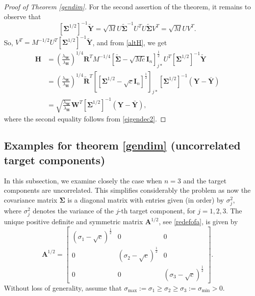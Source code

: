 \documentclass{article}
\theoremstyle{plain}
\theoremstyle{definition}
\theoremstyle{remark}
\newcommand{\bW}{{\mathbf W}}
\newcommand{\bY}{{\mathbf Y}}
\newcommand{\bR}{{\mathbf R}}
\newcommand{\bA}{{\mathbf A}}
\newcommand{\bH}{{\mathbf H}}
\newcommand{\bI}{{\mathbf I}}
\newcommand{\bYb}{{\bar{\mathbf Y}}}
\newcommand{\bSigma}{{\mathbf \Sigma}}
\newcommand{\lH}{\lambda_{\bH}}
\newcommand{\lW}{\lambda_{\bW}}
\begin{document}
\begin{proof}[Proof of Theorem \ref{gendim}]
For the second assertion of the theorem, it remains to observe that 
\[
[\bSigma^{1/2}]^{-1} \tilde{\bY}=\sqrt{M} U \tilde{\bSigma}^{-1} U^T U \tilde{\bSigma} V^T=\sqrt{M} U V^T.
\]
So, $V^T=M^{-1/2} U^T [\bSigma^{1/2}]^{-1} \tilde{\bY}$, and from \eqref{altH}, we get
\begin{align*}
\bH &= \left(\frac{\lW}{\lH}\right)^{1/4} \bR^T M^{-1/4} \left[\tilde{\bSigma}-\sqrt{M c}\bI_n\right]_{j*}^{\frac{1}{2}} U^T [\bSigma^{1/2}]^{-1} \tilde{\bY}
\\
&= \left(\frac{\lW}{\lH}\right)^{1/4} \tilde{\bR}^T \left[\left[\bSigma^{1/2}-\sqrt{c}\bI_n\right]^{\frac{1}{2}}\right]_{j*} [\bSigma^{1/2}]^{-1} (\bY-\bYb)
\\
&= \sqrt{\frac{\lW}{\lH}} \bW^T [\bSigma^{1/2}]^{-1} (\bY-\bYb),
\end{align*}
where the second equality follows from \eqref{eigendec2}.

\end{proof}

\subsection{Examples for theorem \ref{gendim} (uncorrelated target components)} \label{specialcases}

In this subsection, we examine closely the case when $n=3$ and the target components are uncorrelated. This simplifies considerably the problem as now the covariance matrix $\bSigma$ is a diagonal matrix with entries given (in order) by $\sigma_j^2$, where $\sigma_j^2$ denotes the variance of the $j$-th target component, for $j=1,2,3$. The unique positive definite and symmetric matrix $\bA^{1/2}$, see \eqref{redefofa}, is given by 
\begin{equation} \label{rootofA}
\bA^{1/2}=
\begin{bmatrix}
(\sigma_1-\sqrt{c})^{\frac{1}{2}} & 0 & 0
\\
0 & (\sigma_2 -\sqrt{c})^{\frac{1}{2}} & 0
\\
0 & 0 & (\sigma_3 - \sqrt{c})^{\frac{1}{2}}
\end{bmatrix}.
\end{equation}
Without loss of generality, assume that $\sigma_{\text{max}}:=\sigma_1\ge \sigma_2\ge \sigma_3:=\sigma_{\text{min}}>0$. 
\end{document}
